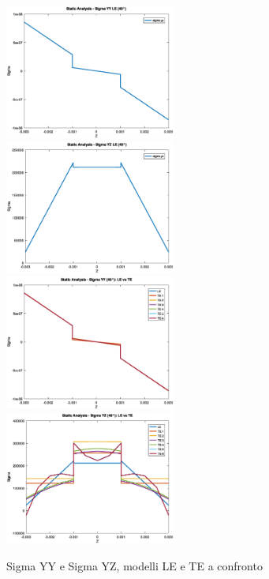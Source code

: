 \documentclass{article}
\begin{document}
            \begin{figure}[h!]
                 \label{fig:sigmas_static_45}
                \includegraphics[width=0.5\textwidth]{MUL2/Esercitazione3/MUL2_FEM/OUTPUT/PLOT/static_YY_LE_45.svg.eps}
                \includegraphics[width=0.5\textwidth]{MUL2/Esercitazione3/MUL2_FEM/OUTPUT/PLOT/static_YZ_LE_45.svg.eps}
                \includegraphics[width=0.5\textwidth]{MUL2/Esercitazione3/MUL2_FEM/OUTPUT/PLOT/static_YY_LEvsTE_45.svg.eps}
                \includegraphics[width=0.5\textwidth]{MUL2/Esercitazione3/MUL2_FEM/OUTPUT/PLOT/static_YZ_LEvsTE_45.svg.eps}
                \caption{Sigma YY e Sigma YZ, modelli LE e TE a confronto}
            \end{figure}
\end{document}

